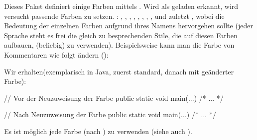 \documentclass{sopra-base}
\begin{document}
    Dieses Paket definiert einige Farben mittels . Wird  als geladen erkannt, wird versucht passende Farben zu setzen. : , , , , , , , ,  und zuletzt , wobei die Bedeutung der einzelnen Farben aufgrund ihres Namens hervorgehen sollte (jeder Sprache steht es frei die gleich zu besprechenden Stile, die
    auf diesen Farben aufbauen, (beliebig) zu verwenden). Beispielsweise kann man die Farbe
    von Kommentaren wie folgt ändern ():
\begin{plainlatex}[morekeywords={[2]{\\lstcolorlet}}]
\end{plainlatex}
    Wir erhalten(exemplarisch in Java, zuerst standard, danach mit geänderter Farbe):
    \begingroup
\begin{java}
// Vor der Neuzuweisung der Farbe
public static void main(...){ /* ... */ }
\end{java}
\begin{java}
// Nach Neuzuweisung der Farbe
public static void main(...){ /* ... */ }
    \end{java}
    \endgroup
 Es ist möglich jede Farbe (nach ) zu verwenden (siehe auch ).
\end{document}
